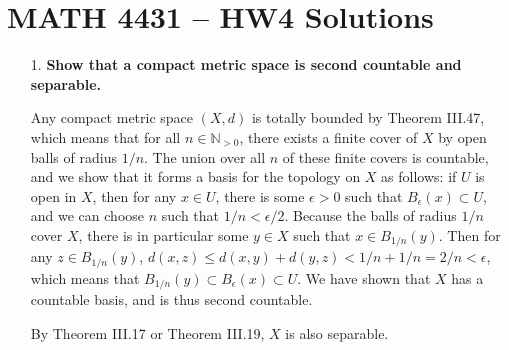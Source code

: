 \documentclass[a4paper,12pt]{article}
\begin{document}
\section*{MATH 4431 -- HW4 Solutions}
\begin{enumerate}
    \item[1.]
        \boldmath\textbf{Show that a compact metric space is second countable and separable.
        }\unboldmath \par
        Any compact metric space $(X, d)$ is totally bounded by Theorem III.47, which means that for all $n \in \mathbb{N}_{> 0}$, there exists a finite cover of $X$ by open balls of radius $1/n$. The union over all $n$ of these finite covers is countable, and we show that it forms a basis for the topology on $X$ as follows: if $U$ is open in $X$, then for any $x \in U$, there is some $\epsilon > 0$ such that $B_\epsilon(x) \subset U$, and we can choose $n$ such that $1/n < \epsilon/2$. Because the balls of radius $1/n$ cover $X$, there is in particular some $y \in X$ such that $x \in B_{1/n}(y)$. Then for any $z \in B_{1/n}(y)$, $d(x, z) \leq d(x, y) + d(y, z) < 1/n + 1/n = 2/n < \epsilon$, which means that $B_{1/n}(y) \subset B_\epsilon(x) \subset U$. We have shown that $X$ has a countable basis, and is thus second countable. \par%
        By Theorem III.17 or Theorem III.19, $X$ is also separable.


\end{enumerate}
\end{document}
